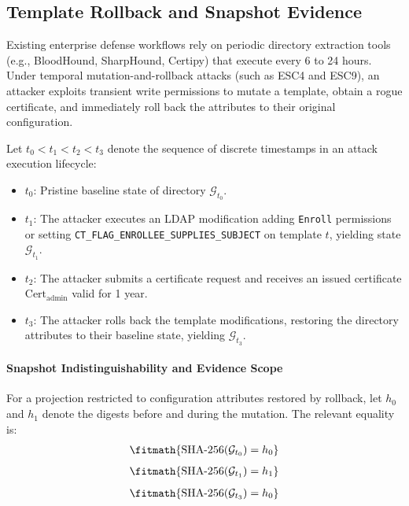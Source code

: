 \subsection{Template Rollback and Snapshot Evidence}
Existing enterprise defense workflows rely on periodic directory extraction tools (e.g., BloodHound, SharpHound, Certipy) that execute every 6 to 24 hours. Under temporal mutation-and-rollback attacks (such as ESC4 and ESC9), an attacker exploits transient write permissions to mutate a template, obtain a rogue certificate, and immediately roll back the attributes to their original configuration.

\begin{definition}
Let $t_0 < t_1 < t_2 < t_3$ denote the sequence of discrete timestamps in an attack execution lifecycle:
\begin{itemize}
    \item $t_0$: Pristine baseline state of directory $\mathcal{G}_{t_0}$.
    \item $t_1$: The attacker executes an LDAP modification adding \texttt{Enroll} permissions or setting \texttt{CT\_FLAG\_ENROLLEE\_SUPPLIES\_SUBJECT} on template $t$, yielding state $\mathcal{G}_{t_1}$.
    \item $t_2$: The attacker submits a certificate request and receives an issued certificate $\text{Cert}_{\text{admin}}$ valid for 1 year.
    \item $t_3$: The attacker rolls back the template modifications, restoring the directory attributes to their baseline state, yielding $\mathcal{G}_{t_3}$.
\end{itemize}
\end{definition}

\paragraph{Snapshot Indistinguishability and Evidence Scope}
For a projection restricted to configuration attributes restored by rollback, let $h_0$ and $h_1$ denote the digests before and during the mutation. The relevant equality is:
\begin{equation}
\fitmath{\begin{gathered}\text{SHA-256}(\mathcal{G}_{t_0}) = h_0\end{gathered}}
\end{equation}
\begin{equation}
\fitmath{\begin{gathered}\text{SHA-256}(\mathcal{G}_{t_1}) = h_1\end{gathered}}
\end{equation}
\begin{equation}
\fitmath{\begin{gathered}\text{SHA-256}(\mathcal{G}_{t_3}) = h_0\end{gathered}}
\end{equation}

